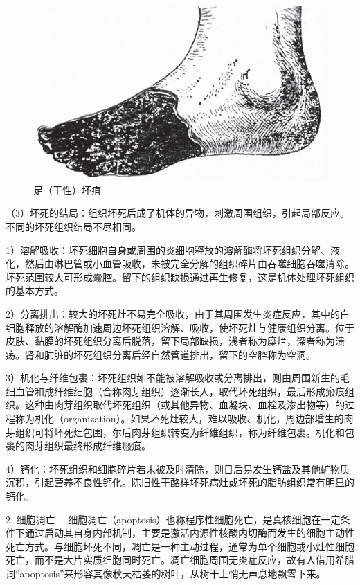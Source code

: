 \begin{figure}[!htbp]
	\centering
    \includegraphics{./images/Image00018.jpg}
	\caption{足（干性）坏疽}
	\label{fig1-17} 
    \end{figure} 

（3）坏死的结局：组织坏死后成了机体的异物，刺激周围组织，引起局部反应。不同的坏死组织结局不尽相同。

1）溶解吸收：坏死细胞自身或周围的炎细胞释放的溶解酶将坏死组织分解、液化，然后由淋巴管或小血管吸收，未被完全分解的组织碎片由吞噬细胞吞噬清除。坏死范围较大可形成囊腔。留下的组织缺损通过再生修复，这是机体处理坏死组织的基本方式。

2）分离排出：较大的坏死灶不易完全吸收，由于其周围发生炎症反应，其中的白细胞释放的溶解酶加速周边坏死组织溶解、吸收，使坏死灶与健康组织分离。位于皮肤、黏膜的坏死组织分离后脱落，留下局部缺损，浅者称为糜烂，深者称为溃疡。肾和肺脏的坏死组织分离后经自然管道排出，留下的空腔称为空洞。

3）机化与纤维包裹：坏死组织如不能被溶解吸收或分离排出，则由周围新生的毛细血管和成纤维细胞（合称肉芽组织）逐渐长入，取代坏死组织，最后形成瘢痕组织。这种由肉芽组织取代坏死组织（或其他异物、血凝块、血栓及渗出物等）的过程称为机化（organization）。如果坏死灶较大，难以吸收、机化，周边部增生的肉芽组织可将坏死灶包围，尔后肉芽组织转变为纤维组织，称为纤维包裹。机化和包裹的肉芽组织最终形成纤维瘢痕。

4）钙化：坏死组织和细胞碎片若未被及时清除，则日后易发生钙盐及其他矿物质沉积，引起营养不良性钙化。陈旧性干酪样坏死病灶或坏死的脂肪组织常有明显的钙化。

{2. 细胞凋亡}
　细胞凋亡（apoptosis）也称程序性细胞死亡，是真核细胞在一定条件下通过启动其自身内部机制，主要是激活内源性核酸内切酶而发生的细胞主动性死亡方式。与细胞坏死不同，凋亡是一种主动过程，通常为单个细胞或小灶性细胞死亡，而不是大片实质细胞同时死亡。凋亡细胞周围无炎症反应，故有人借用希腊词“apoptosis”来形容其像秋天枯萎的树叶，从树干上悄无声息地飘零下来。

